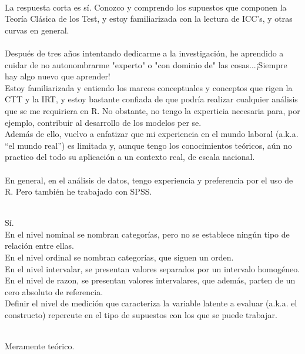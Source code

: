 \documentclass[11pt]{article}
\begin{document}
\begin{question}
\\
La respuesta corta es sí. Conozco y comprendo los supuestos que componen la Teoría Clásica de los Test, y estoy familiarizada con la lectura de ICC's, y otras curvas en general.\\

\\
Después de tres años intentando dedicarme a la investigación, he aprendido a cuidar de no autonombrarme "experto" o "con dominio de" las cosas...¡Siempre hay algo nuevo que aprender!\\

Estoy familiarizada y entiendo los marcos conceptuales y conceptos que rigen la CTT y la IRT, y estoy bastante confiada de que podría realizar cualquier análisis que se me requiriera en R. No obstante, no tengo la experticia necesaria para, por ejemplo, contribuir al desarrollo de los modelos per se.\\

Además de ello, vuelvo a enfatizar que mi experiencia en el mundo laboral (a.k.a. ``el mundo real'') es limitada y, aunque tengo los conocimientos teóricos, aún no practico del todo su aplicación a un contexto real, de escala nacional.\\

\\
En general, en el análisis de datos, tengo experiencia y preferencia por el uso de R. Pero también he trabajado con SPSS. 

\\
Sí.\\

En el nivel nominal se nombran categorías, pero no se establece ningún tipo de relación entre ellas.\\
En el nivel ordinal se nombran categorías, que siguen un orden.\\
En el nivel intervalar, se presentan valores separados por un intervalo  homogéneo.\\
En el nivel de razon, se presentan valores intervalares, que además, parten de un cero absoluto de referencia.\\

Definir el nivel de medición que caracteriza la variable latente a evaluar (a.k.a. el constructo) repercute en el tipo de supuestos con los que se puede trabajar.

\\

Meramente teórico.



\end{question}
\end{document}
